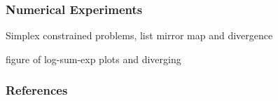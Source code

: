 \documentclass{beamer}
\begin{document}
\begin{frame}
\frametitle{Numerical Experiments}
Simplex constrained problems, list mirror map and divergence

figure of log-sum-exp plots and diverging
\end{frame}

\begin{frame}[t, allowframebreaks]
\frametitle{References}
\footnotesize{


\cite{*}}
\end{frame}
\end{document}

